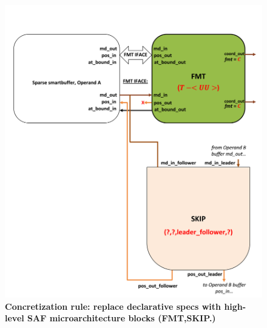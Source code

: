 \begin{figure}[ht]
\includegraphics[width=\textwidth]{figures/safinference_build_01concretization.png}
\caption{\textbf{Concretization rule: replace declarative specs with high-level SAF microarchitecture blocks (FMT,SKIP.)}}
\label{fig:safinference_build_01concretization}
\centering
\end{figure}

